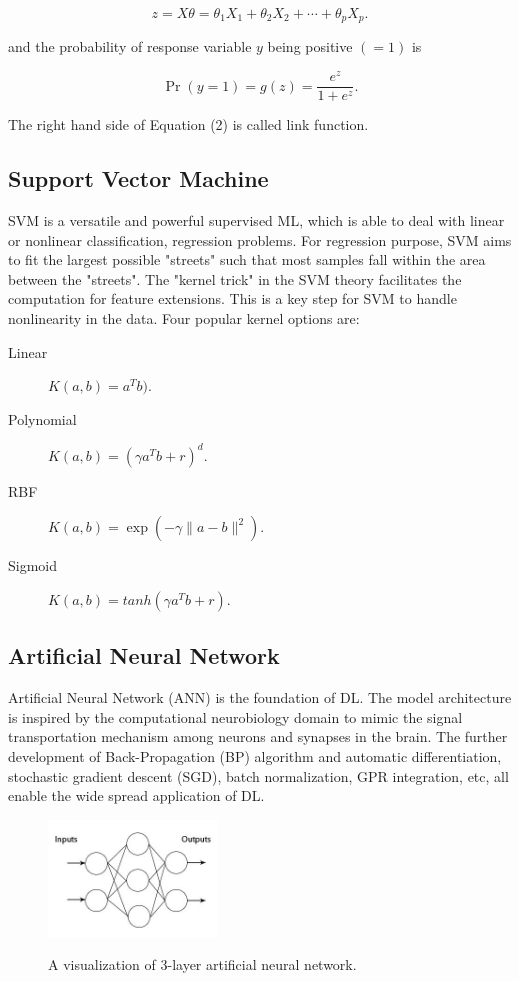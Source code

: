 \documentclass{article}
\begin{document}
\begin{equation}
z = X \theta = \theta_1 X_1 + \theta_2 X_2 + \cdots + \theta_p X_p. 
\end{equation}

and the probability of response variable $y$ being positive $(=1)$ is 

\begin{equation}
\Pr(y=1) = g(z) = \frac{e^z}{1+ e^z}. 
\end{equation}

The right hand side of Equation (2) is called link function.


\subsection{Support Vector Machine}
SVM is a versatile and powerful supervised ML, which is able to deal with linear or nonlinear classification, regression problems. For regression purpose, SVM aims to fit the largest possible "streets" such that most samples fall within the area between the "streets". The "kernel trick" in the SVM theory facilitates the computation for feature extensions. This is a key step for SVM to handle nonlinearity in the data. Four popular kernel options are: 
\begin{description}
\item[Linear] $K(a,b) = a^Tb)$.
\item[Polynomial] $K(a,b) = (\gamma a^Tb+r)^d$.
\item[RBF] $K(a,b) = \exp(-\gamma\|a-b\|^2)$.
\item[Sigmoid] $K(a,b) = tanh(\gamma a^Tb+r)$.
\end{description}



\subsection{Artificial Neural Network}

Artificial Neural Network (ANN) is the foundation of DL. The model architecture is inspired by the computational neurobiology domain to mimic the signal transportation mechanism among neurons and synapses in the brain. The further development of Back-Propagation (BP) algorithm and automatic differentiation, stochastic gradient descent (SGD), batch normalization, GPR integration, etc, all enable the wide spread application of DL. 

\begin{figure}[htbp]
\centering
  {\includegraphics[width=0.4\textwidth]{ann.jpeg}}
    {\caption{A visualization of 3-layer artificial neural network.} \label{fig:ann}}
\end{figure}
\end{document}
